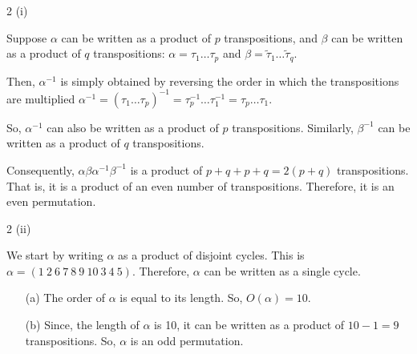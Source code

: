 \documentclass[11pt]{penrose}
\begin{document}
\begin{problem}{2 (i)}

    Suppose $\alpha$ can be written as a product of $p$ transpositions, and $\beta$ can be written as a product of $q$ transpositions: $\alpha = \tau_1 \dots \tau_p$ and $\beta = \tilde{\tau}_1 \dots \tilde{\tau}_q$.

    Then, $\alpha^{-1}$ is simply obtained by reversing the order in which the transpositions are multiplied $\alpha^{-1} = (\tau_1 \dots \tau_p)^{-1} = \tau_p^{-1} \dots \tau_1^{-1} = \tau_p \dots \tau_1$.
    
    So, $\alpha^{-1}$ can also be written as a product of $p$ transpositions. Similarly, $\beta^{-1}$ can be written as a product of $q$ transpositions.

    Consequently, $\alpha\beta\alpha^{-1}\beta^{-1}$ is a product of $p+q+p+q = 2(p+q)$ transpositions. That is, it is a product of an even number of transpositions. Therefore, it is an even permutation.
\end{problem}

\begin{problem}{2 (ii)}

    We start by writing $\alpha$ as a product of disjoint cycles. This is $\alpha = (1\ 2\ 6\ 7\ 8\ 9\ 10\ 3\ 4\ 5)$.    Therefore, $\alpha$ can be written as a single cycle.

    \begin{enumerate}
        \item[(a)] The order of $\alpha$ is equal to its length. So, $O(\alpha) = 10$.
        \item[(b)] Since, the length of $\alpha$ is 10, it can be written as a product of $10-1=9$ transpositions. So, $\alpha$ is an odd permutation.
    \end{enumerate}
\end{problem}
\end{document}
